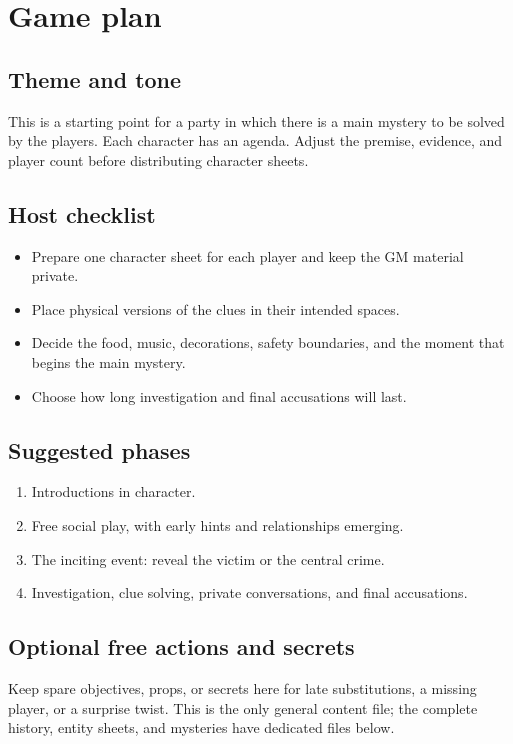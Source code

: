 \section{Game plan}


\subsection{Theme and tone}
This is a starting point for a party in which there is a main mystery to be solved by the players. Each character has an agenda. Adjust the premise, evidence, and player count before distributing character sheets.

\subsection{Host checklist}
\begin{itemize}
  \item Prepare one character sheet for each player and keep the GM material private.
  \item Place physical versions of the clues in their intended spaces.
  \item Decide the food, music, decorations, safety boundaries, and the moment that begins the main mystery.
  \item Choose how long investigation and final accusations will last.
\end{itemize}

\subsection{Suggested phases}
\begin{enumerate}
  \item Introductions in character.
  \item Free social play, with early hints and relationships emerging.
  \item The inciting event: reveal the victim or the central crime.
  \item Investigation, clue solving, private conversations, and final accusations.
\end{enumerate}

\subsection{Optional free actions and secrets}
Keep spare objectives, props, or secrets here for late substitutions, a missing player, or a surprise twist. This is the only general content file; the complete history, entity sheets, and mysteries have dedicated files below.
